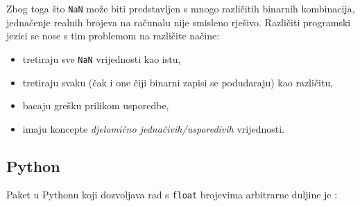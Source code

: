 Zbog toga što \verb|NaN| može biti predstavljen s mnogo različitih binarnih kombinacija, jednačenje realnih brojeva na računalu nije smisleno rješivo. Različiti programski jezici se nose s tim problemom na različite načine:

\begin{itemize}
    \item tretiraju sve \verb|NaN| vrijednosti kao istu,
    \item tretiraju svaku (čak i one čiji binarni zapisi se podudaraju) kao različitu,
    \item bacaju grešku prilikom usporedbe,
    \item imaju koncepte \textit{djelomično jednačivih/usporedivih} vrijednosti.
\end{itemize}

\subsection{Python}

Paket u Pythonu koji dozvoljava rad s \verb|float| brojevima arbitrarne duljine je \texttt{}:


